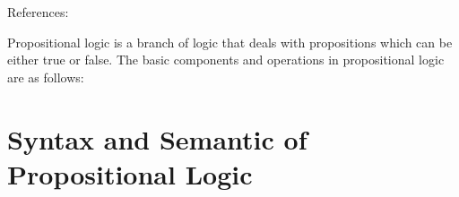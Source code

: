 
References:\cite{youtube:COSE419-Lecture4-1}

Propositional logic is a branch of logic that deals with propositions which can be either true or false. The basic components and operations in propositional logic are as follows:

%
%

\section{Syntax and Semantic of Propositional Logic}
\begin{center}

\end{center}
